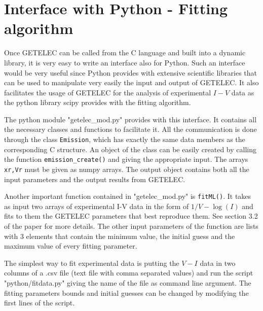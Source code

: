 \documentclass[notitlepage]{revtex4-1}
\begin{document}
\section{Interface with Python - Fitting algorithm}
\label{sec:Python}

Once GETELEC can be called from the C language and built into a dynamic library, it is very easy to write an interface also for Python. Such an interface would be very useful since Python provides with extensive scientific libraries that can be used to manipulate very easily the input and output of GETELEC. It also facilitates the usage of GETELEC for the analysis of experimental $I-V$ data as the python library scipy provides with the fitting algorithm.

The python module "getelec\_mod.py" provides with this interface. It contains all the necessary classes and functions to facilitate it. All the communication is done through the class \texttt{Emission}, which has exactly the same data members as the corresponding C structure. An object of the class can be easily created by calling the function \texttt{emission\_create()} and giving the appropriate input. The arrays \texttt{xr,Vr} must be given as numpy arrays. The output object contains both all the input parameters and the output results from GETELEC.

Another important function contained in "getelec\_mod.py" is \texttt{fitML()}. It takes as input two arrays of experimental I-V data in the form of $1/V-\log(I)$ and fits to them the GETELEC parameters that best reproduce them. See section 3.2 of the paper for more details. The other input parameters of the function are lists with 3 elements that contain the minimum value, the initial guess and the maximum value of every fitting parameter.

The simplest way to fit experimental data is putting the $V-I$ data in two columns of a .csv file (text file with comma separated values) and run the script "python/fitdata.py" giving the name of the file as command line argument. The fitting parameters bounds and initial guesses can be changed by modifying the first lines of the script.
%
\end{document}

